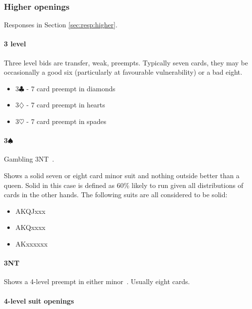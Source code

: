 \documentclass[a4paper,14pt]{extarticle}
\begin{document}
\subsubsection{Higher openings}
\label{sec:open:higher}

Responses in Section \ref{sec:resp:higher}.

\paragraph{3 level}

Three level bids are transfer, weak, preempts. Typically seven cards, they may
be occasionally a good six (particularly at favourable vulnerability) or a bad
eight.

\begin{itemize}
\item 3$\clubsuit$ - 7 card preempt in diamonds 
\item 3$\diamondsuit$ - 7 card preempt in hearts 
\item 3$\heartsuit$ - 7 card preempt in spades 
\end{itemize}

\paragraph{3$\spadesuit$}

Gambling 3NT~. 

Shows a solid seven or eight card minor suit and nothing outside better than a
queen.  Solid in this case is defined as 60\% likely to run given all
distributions of cards in the other hands. The following suits are all
considered to be solid:

\begin{itemize}
\item AKQJxxx
\item AKQxxxx
\item AKxxxxxx
\end{itemize}

\paragraph{3NT}

Shows a 4-level preempt in either minor~. Usually eight cards. 

\paragraph{4-level suit openings}
\end{document}
